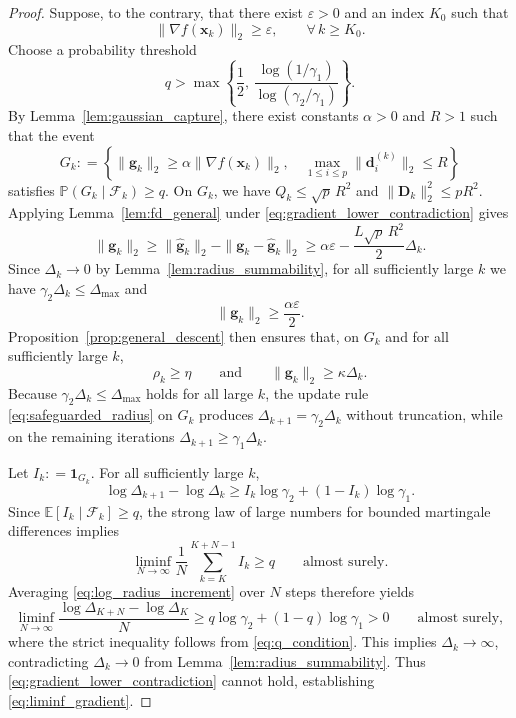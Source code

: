 \documentclass{siamart171218}
\newcommand{\bx}{\bm{x}}
\newcommand{\bd}{\bm{d}}
\newcommand{\bg}{\bm{g}}
\providecommand{\coloneqq}{\mathrel{\mathop:}=}
\begin{document}
\begin{proof}
Suppose, to the contrary, that there exist $\varepsilon>0$ and an index $K_0$ such that
\begin{equation}
\label{eq:gradient_lower_contradiction}
\|\nabla f(\bx_k)\|_2 \ge \varepsilon, \qquad \forall\, k\ge K_0.
\end{equation}
Choose a probability threshold
\begin{equation}
\label{eq:q_condition}
q > \max\left\{ \frac{1}{2},\, \frac{\log(1/\gamma_1)}{\log(\gamma_2/\gamma_1)} \right\}.
\end{equation}
By Lemma~\ref{lem:gaussian_capture}, there exist constants $\alpha>0$ and $R>1$ such that the event
\[
G_k \coloneqq \left\{ \|\hat{\bg}_k\|_2 \ge \alpha\|\nabla f(\bx_k)\|_2, \quad \max_{1\le i\le p}\|\bd_i^{(k)}\|_2\le R \right\}
\]
satisfies $\mathbb P(G_k\mid\mathcal F_k)\ge q$. On $G_k$, we have $Q_k\le\sqrt p\,R^2$ and $\|\bm D_k\|_2^2\le pR^2$. Applying Lemma~\ref{lem:fd_general} under \eqref{eq:gradient_lower_contradiction} gives
\[
\|\bg_k\|_2 \ge \|\hat{\bg}_k\|_2 - \|\bg_k-\hat{\bg}_k\|_2 \ge \alpha\varepsilon - \frac{L\sqrt p\,R^2}{2}\Delta_k.
\]
Since $\Delta_k\to0$ by Lemma~\ref{lem:radius_summability}, for all sufficiently large $k$ we have $\gamma_2\Delta_k \le \Delta_{\max}$ and
\begin{equation}
\label{eq:g_lower_good}
\|\bg_k\|_2 \ge \frac{\alpha\varepsilon}{2}.
\end{equation}
Proposition~\ref{prop:general_descent} then ensures that, on $G_k$ and for all sufficiently large $k$,
\[
\rho_k\ge\eta \qquad \text{and} \qquad \|\bg_k\|_2\ge\kappa\Delta_k.
\]
Because $\gamma_2\Delta_k \le \Delta_{\max}$ holds for all large $k$, the update rule \eqref{eq:safeguarded_radius} on $G_k$ produces $\Delta_{k+1}=\gamma_2\Delta_k$ without truncation, while on the remaining iterations $\Delta_{k+1}\ge\gamma_1\Delta_k$.

Let $I_k \coloneqq \mathbf{1}_{G_k}$. For all sufficiently large $k$,
\begin{equation}
\label{eq:log_radius_increment}
\log\Delta_{k+1}-\log\Delta_k \ge I_k\log\gamma_2 + (1-I_k)\log\gamma_1.
\end{equation}
Since $\mathbb E[I_k\mid\mathcal F_k] \ge q$, the strong law of large numbers for bounded martingale differences implies
\[
\liminf_{N\to\infty} \frac{1}{N} \sum_{k=K}^{K+N-1} I_k \ge q \qquad \text{almost surely}.
\]
Averaging \eqref{eq:log_radius_increment} over $N$ steps therefore yields
\[
\liminf_{N\to\infty} \frac{\log\Delta_{K+N}-\log\Delta_K}{N} \ge q\log\gamma_2 + (1-q)\log\gamma_1 > 0 \qquad \text{almost surely},
\]
where the strict inequality follows from \eqref{eq:q_condition}. This implies $\Delta_k \to \infty$, contradicting $\Delta_k\to0$ from Lemma~\ref{lem:radius_summability}. Thus \eqref{eq:gradient_lower_contradiction} cannot hold, establishing \eqref{eq:liminf_gradient}.
\end{proof}
\end{document}
